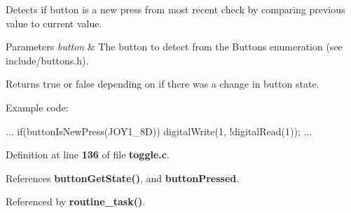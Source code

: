 Detects if button is a new press from most recent check by comparing previous value to current value. 


\begin{DoxyParams}{Parameters}
{\em button} & The button to detect from the Buttons enumeration (see include/buttons.\+h).\\
\hline
\end{DoxyParams}
\begin{DoxyReturn}{Returns}
true or false depending on if there was a change in button state.
\end{DoxyReturn}
Example code\+: 
\begin{DoxyCode}
...
if(buttonIsNewPress(JOY1_8D))
    digitalWrite(1, !digitalRead(1));
...
\end{DoxyCode}
 

Definition at line \textbf{ 136} of file \textbf{ toggle.\+c}.



References \textbf{ button\+Get\+State()}, and \textbf{ button\+Pressed}.



Referenced by \textbf{ routine\+\_\+task()}.


